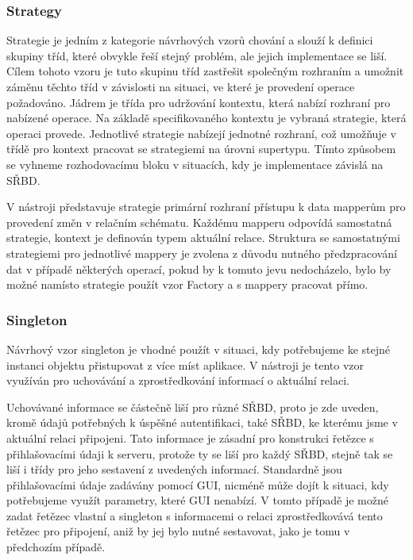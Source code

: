 \documentclass[czech,bachelor,public,dept460,male,oneside]{diploma}
\begin{document}
		\subsubsection{Strategy} \label{secStrategy}
		Strategie je jedním z kategorie návrhových vzorů chování a slouží k definici skupiny tříd, které obvykle řeší stejný problém, ale jejich implementace se liší. Cílem tohoto vzoru je tuto skupinu tříd zastřešit společným rozhraním a umožnit záměnu těchto tříd v závislosti na situaci, ve které je provedení operace požadováno. Jádrem je třída pro udržování kontextu, která nabízí rozhraní pro nabízené operace. Na základě specifikovaného kontextu je vybraná strategie, která operaci provede. Jednotlivé strategie nabízejí jednotné rozhraní, což umožňuje v třídě pro kontext pracovat se strategiemi na úrovni supertypu. Tímto způsobem se vyhneme rozhodovacímu bloku v situacích, kdy je implementace závislá na SŘBD.
		
		V nástroji představuje strategie primární rozhraní přístupu k data mapperům pro provedení změn v relačním schématu. Každému mapperu odpovídá samostatná strategie, kontext je definován typem aktuální relace. Struktura se samostatnými strategiemi pro jednotlivé mappery je zvolena z důvodu nutného předzpracování dat v případě některých operací, pokud by k tomuto jevu nedocházelo, bylo by možné namísto strategie použít vzor Factory a s mappery pracovat přímo. 
		
		\subsubsection{Singleton}
		Návrhový vzor singleton je vhodné použít v situaci, kdy potřebujeme ke stejné instanci objektu přistupovat z více míst aplikace. V nástroji je tento vzor využíván pro uchovávání a zprostředkování informací o aktuální relaci. 
		
		Uchovávané informace se částečně liší pro různé SŘBD, proto je zde uveden, kromě údajů potřebných k úspěšné autentifikaci, také SŘBD, ke kterému jsme v aktuální relaci připojeni. Tato informace je zásadní pro konstrukci řetězce s přihlašovacími údaji k serveru, protože ty se liší pro každý SŘBD, stejně tak se liší i třídy pro jeho sestavení z uvedených informací. Standardně jsou přihlašovacími údaje zadávány pomocí GUI, nicméně může dojít k situaci, kdy potřebujeme využít parametry, které GUI nenabízí. V tomto případě je možné zadat řetězec vlastní a singleton s informacemi o relaci zprostředkovává tento řetězec pro připojení, aniž by jej bylo nutné sestavovat, jako je tomu v předchozím případě.
		
\end{document}
